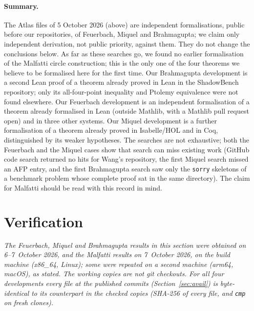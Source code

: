 \documentclass[11pt]{article}
\theoremstyle{definition}
\theoremstyle{remark}
\newcommand{\lean}[1]{\texttt{#1}}
\begin{document}
\paragraph{Summary.} The Atlas files of 5 October 2026 (above) are independent formalisations, public before our repositories,
of Feuerbach, Miquel and Brahmagupta; we claim only independent derivation, not public priority, against them. They do not change the conclusions below. As far as these searches go, we found no earlier formalisation of the
Malfatti circle construction; this is the only one of the four theorems we believe to be formalised
here for the first time. Our Brahmagupta development is a second Lean proof of a theorem already
proved in Lean in the ShadowBench repository; only its all-four-point inequality and Ptolemy
equivalence were not found elsewhere. Our Feuerbach development is
an independent formalisation of a theorem already formalised in Lean (outside Mathlib, with a
Mathlib pull request open) and in three other systems. Our Miquel development is a further
formalisation of a theorem already proved in Isabelle/HOL and in Coq, distinguished by its weaker
hypotheses. The searches are not exhaustive; both the Feuerbach and the Miquel cases show that
search can miss existing work (GitHub code search returned no hits for Wang's repository, the
first Miquel search missed an AFP entry, and the first Brahmagupta search saw only the
\lean{sorry} skeletons of a benchmark problem whose complete proof sat in the same directory).
The claim for Malfatti should be read with this record in mind.

\section{Verification}\label{sec:verify}

\emph{The Feuerbach, Miquel and Brahmagupta results in this section were obtained on 6--7~October
2026, and the Malfatti results on 7~October 2026, on the build machine (x86\_64, Linux); some were
repeated on a second machine (arm64, macOS), as stated. The working copies are not git checkouts.
For all four developments every  file at the published commits
(Section~\ref{sec:avail}) is byte-identical to its counterpart in the checked copies (SHA-256 of every  file, and \lean{cmp} on fresh clones).}
\end{document}
